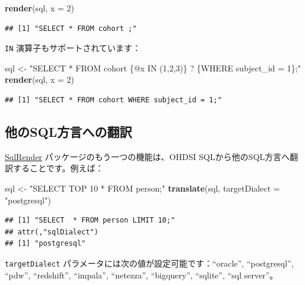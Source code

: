 \documentclass[
  11pt]{book}
\newenvironment{Shaded}{\begin{snugshade}}{\end{snugshade}}
\newcommand{\AttributeTok}[1]{\textcolor[rgb]{0.13,0.29,0.53}{#1}}
\newcommand{\DecValTok}[1]{\textcolor[rgb]{0.00,0.00,0.81}{#1}}
\newcommand{\FunctionTok}[1]{\textcolor[rgb]{0.13,0.29,0.53}{\textbf{#1}}}
\newcommand{\NormalTok}[1]{#1}
\newcommand{\OtherTok}[1]{\textcolor[rgb]{0.56,0.35,0.01}{#1}}
\newcommand{\StringTok}[1]{\textcolor[rgb]{0.31,0.60,0.02}{#1}}
\theoremstyle{definition}
\theoremstyle{definition}
\theoremstyle{definition}
\theoremstyle{definition}
\theoremstyle{remark}
\begin{document}
\begin{Shaded}
\begin{Highlighting}[]
\FunctionTok{render}\NormalTok{(sql, }\AttributeTok{x =} \DecValTok{2}\NormalTok{)}
\end{Highlighting}
\end{Shaded}

\begin{verbatim}
## [1] "SELECT * FROM cohort ;"
\end{verbatim}

\texttt{IN} 演算子もサポートされています：

\begin{Shaded}
\begin{Highlighting}[]
\NormalTok{sql }\OtherTok{\textless{}{-}} \StringTok{"SELECT * FROM cohort \{@x IN (1,2,3)\} ? \{WHERE subject\_id = 1\};"}
\FunctionTok{render}\NormalTok{(sql, }\AttributeTok{x =} \DecValTok{2}\NormalTok{)}
\end{Highlighting}
\end{Shaded}

\begin{verbatim}
## [1] "SELECT * FROM cohort WHERE subject_id = 1;"
\end{verbatim}

\subsection{他のSQL方言への翻訳}\label{ux4ed6ux306esqlux65b9ux8a00ux3078ux306eux7ffbux8a33}

\href{https://ohdsi.github.io/SqlRender/}{SqlRender} パッケージのもう一つの機能は、OHDSI SQLから他のSQL方言へ翻訳することです。例えば：

\begin{Shaded}
\begin{Highlighting}[]
\NormalTok{sql }\OtherTok{\textless{}{-}} \StringTok{"SELECT TOP 10 * FROM person;"}
\FunctionTok{translate}\NormalTok{(sql, }\AttributeTok{targetDialect =} \StringTok{"postgresql"}\NormalTok{)}
\end{Highlighting}
\end{Shaded}

\begin{verbatim}
## [1] "SELECT  * FROM person LIMIT 10;"
## attr(,"sqlDialect")
## [1] "postgresql"
\end{verbatim}

\texttt{targetDialect} パラメータには次の値が設定可能です：``oracle'', ``postgresql'', ``pdw'', ``redshift'', ``impala'', ``netezza'', ``bigquery'', ``sqlite'', ``sql server''。 
\end{document}
